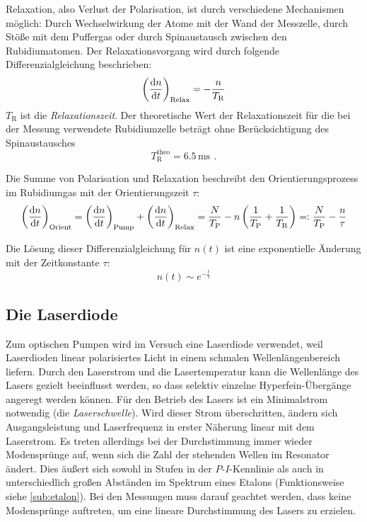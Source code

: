 Relaxation, also Verlust der Polarisation, ist durch verschiedene Mechanismen möglich:
Durch Wechselwirkung der Atome mit der Wand der Messzelle, durch Stöße mit dem Puffergas
oder durch Spinaustausch zwischen den Rubidiumatomen.
Der Relaxationsvorgang wird durch folgende Differenzialgleichung beschrieben:
\begin{equation}
    \left(\frac{\mathrm{d} n}{\mathrm{d} t}\right)_{\text{Relax}}=-\frac{n}{T_\text{R}}
\end{equation}
$T_\text{R}$ ist die \emph{Relaxationszeit}. Der theoretische Wert \cite{staatsex} der Relaxationszeit für die bei der Messung 
verwendete Rubidiumzelle beträgt ohne Berücksichtigung des Spinaustausches
\begin{equation}
    \label{eq:tr:theo}
    T_\text{R}^\text{theo} = 6.5\,\text{ms} \ \, .
\end{equation}

Die Summe von Polarisation und Relaxation beschreibt den Orientierungsprozess im Rubidiumgas mit
der Orientierungszeit $\tau$:
\begin{equation}
    \label{eq:orientierungszeit}
    \left(\frac{\mathrm{d} n}{\mathrm{d} t}\right)_{\text{Orient}}
    =\left(\frac{\mathrm{d} n}{\mathrm{d} t}\right)_{\text{Pump}} + \left(\frac{\mathrm{d} n}{\mathrm{d} t}\right)_{\text{Relax}}
    =\frac{N}{T_\text{P}}-n \left( \frac{1}{T_\text{P}} + \frac{1}{T_\text{R}}\right)
    =:\frac{N}{T_\text{P}}- \frac{n}{\tau}
\end{equation}

Die Lösung dieser Differenzialgleichung für $n(t)$ ist eine exponentielle Änderung mit der Zeitkonstante $\tau$:
\begin{equation}
    \label{eq:expabhorient}
    n(t) \sim e^{-\frac{t}{\tau}}
\end{equation}


\subsection{Die Laserdiode}
Zum optischen Pumpen wird im Versuch eine Laserdiode verwendet,
weil Laserdioden linear polarisiertes Licht in einem schmalen Wellenlängenbereich liefern.
Durch den Laserstrom und die Lasertemperatur kann die Wellenlänge des Lasers gezielt
beeinflusst werden, so dass selektiv einzelne Hyperfein-Übergänge angeregt werden können.
Für den Betrieb des Lasers ist ein Minimalstrom notwendig (die \emph{Laserschwelle}).
Wird dieser Strom überschritten, ändern sich Ausgangsleistung und Laserfrequenz
in erster Näherung linear mit dem Laserstrom.
Es treten allerdings bei der Durchstimmung immer wieder Modensprünge auf,
wenn sich die Zahl der stehenden Wellen im Resonator ändert. Dies äußert sich sowohl in Stufen in der $P$-$I$-Kennlinie 
als auch in unterschiedlich großen Abständen im Spektrum eines Etalons (Funktionsweise siehe \autoref{sub:etalon}).
Bei den Messungen muss darauf geachtet werden, dass keine Modensprünge auftreten,
um eine lineare Durchstimmung des Lasers zu erzielen.

